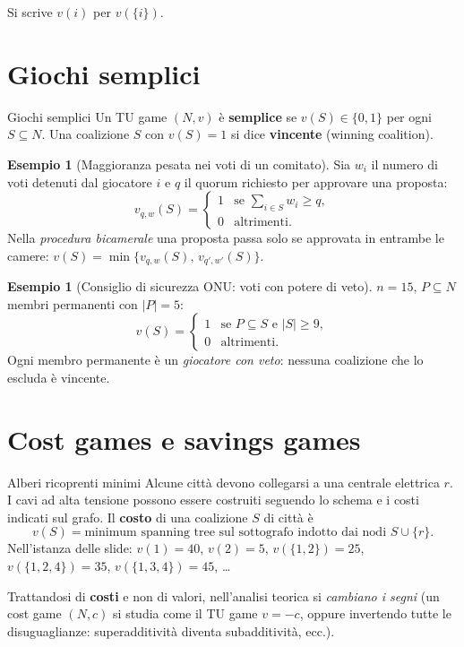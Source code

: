 \documentclass[12pt,a4paper,twoside]{book}
\theoremstyle{plain}
\theoremstyle{definition}
\newtheorem{example}[theorem]{Esempio}
\begin{document}
Si scrive $v(i)$ per $v(\{i\})$.

\section{Giochi semplici}

\begin{defbox}{Giochi semplici}
Un TU game $(N,v)$ è \textbf{semplice} se $v(S)\in\{0,1\}$ per ogni $S\subseteq N$. Una coalizione $S$ con $v(S)=1$ si dice \textbf{vincente} (winning coalition).
\end{defbox}

\begin{example}[Maggioranza pesata nei voti di un comitato]
Sia $w_i$ il numero di voti detenuti dal giocatore $i$ e $q$ il quorum richiesto per approvare una proposta:
\[
v_{q,w}(S)=\begin{cases}1 & \text{se }\sum_{i\in S}w_i\ge q,\\[2pt] 0 & \text{altrimenti.}\end{cases}
\]
Nella \emph{procedura bicamerale} una proposta passa solo se approvata in entrambe le camere:
$v(S)=\min\{v_{q,w}(S),\,v_{q',w'}(S)\}$.
\end{example}

\begin{example}[Consiglio di sicurezza ONU: voti con potere di veto]
$n=15$, $P\subseteq N$ membri permanenti con $|P|=5$:
\[
v(S)=\begin{cases}1 & \text{se } P\subseteq S \text{ e } |S|\ge 9,\\[2pt] 0 & \text{altrimenti.}\end{cases}
\]
Ogni membro permanente è un \emph{giocatore con veto}: nessuna coalizione che lo escluda è vincente.
\end{example}

\section{Cost games e savings games}

\begin{exbox}{Alberi ricoprenti minimi}
Alcune città devono collegarsi a una centrale elettrica $r$. I cavi ad alta tensione possono essere costruiti seguendo lo schema e i costi indicati sul grafo. Il \textbf{costo} di una coalizione $S$ di città è
\[ v(S)=\text{minimum spanning tree sul sottografo indotto dai nodi } S\cup\{r\}. \]
Nell'istanza delle slide: $v(1)=40$, $v(2)=5$, $v(\{1,2\})=25$, $v(\{1,2,4\})=35$, $v(\{1,3,4\})=45$, \dots

Trattandosi di \textbf{costi} e non di valori, nell'analisi teorica si \emph{cambiano i segni} (un cost game $(N,c)$ si studia come il TU game $v=-c$, oppure invertendo tutte le disuguaglianze: superadditività diventa subadditività, ecc.).
\end{exbox}
\end{document}
